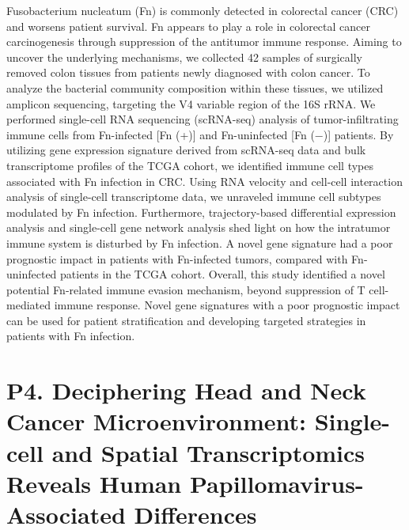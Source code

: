 \noindent
Fusobacterium nucleatum (Fn) is commonly detected in colorectal cancer (CRC) and worsens patient survival. Fn appears to play a role in colorectal cancer carcinogenesis through suppression of the antitumor immune response. Aiming to uncover the underlying mechanisms, we collected 42 samples of surgically removed colon tissues from patients newly diagnosed with colon cancer. To analyze the bacterial community composition within these tissues, we utilized amplicon sequencing, targeting the V4 variable region of the 16S rRNA. We performed single-cell RNA sequencing (scRNA-seq) analysis of tumor-infiltrating immune cells from Fn-infected [Fn (+)] and Fn-uninfected [Fn (−)] patients. By utilizing gene expression signature derived from scRNA-seq data and bulk transcriptome profiles of the TCGA cohort, we identified immune cell types associated with Fn infection in CRC. Using RNA velocity and cell-cell interaction analysis of single-cell transcriptome data, we unraveled immune cell subtypes modulated by Fn infection. Furthermore, trajectory-based differential expression analysis and single-cell gene network analysis shed light on how the intratumor immune system is disturbed by Fn infection. A novel gene signature had a poor prognostic impact in patients with Fn-infected tumors, compared
with Fn-uninfected patients in the TCGA cohort. Overall, this study identified a novel potential Fn-related immune evasion mechanism, beyond suppression of T cell-mediated immune response. Novel gene signatures with a poor prognostic impact can be used for patient stratification and developing targeted strategies in patients with Fn infection.
\newpage


\section*{P4. Deciphering Head and Neck Cancer Microenvironment: Single-cell and Spatial Transcriptomics Reveals Human Papillomavirus-Associated Differences}

